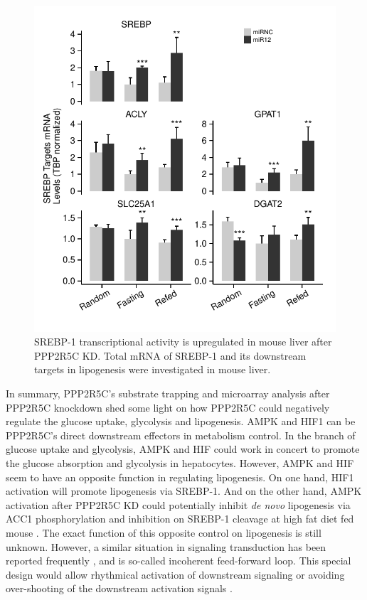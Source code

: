 \begin{figure}[!tbp]
\centering
\includegraphics[width=1\textwidth]{figs/fig2-55 liver srebp.pdf}
\caption[SREBP-1 activity increased in mouse liver]{\footnotesize SREBP-1 transcriptional activity is upregulated in mouse liver after PPP2R5C KD. Total mRNA of SREBP-1 and its downstream targets in lipogenesis were investigated in mouse liver.}
\label{fig:fig2.55}
\end{figure}


In summary, PPP2R5C's substrate trapping and microarray analysis after PPP2R5C knockdown shed some light on how PPP2R5C could negatively regulate the glucose uptake, glycolysis and lipogenesis. AMPK and HIF1\textalpha{} can be PPP2R5C's direct downstream effectors in metabolism control. In the branch of glucose uptake and glycolysis, AMPK and HIF\textalpha{} could work in concert to promote the glucose absorption and glycolysis in hepatocytes. However, AMPK and HIF\textalpha{} seem to have an opposite function in regulating lipogenesis. On one hand, HIF1\textalpha{} activation will promote lipogenesis via SREBP-1. And on the other hand, AMPK activation after PPP2R5C KD could potentially inhibit \textit{de novo} lipogenesis via ACC1 phosphorylation \cite{sullivan_inhibition_1994} and inhibition on SREBP-1 cleavage at high fat diet fed mouse \cite{li_ampk_2011}. The exact function of this opposite control on lipogenesis is still unknown. However, a similar situation in signaling transduction has been reported frequently \cite{kuttykrishnan_quantitative_2010,goentoro_incoherent_2009}, and is so-called incoherent feed-forward loop. This special design would allow rhythmical activation of downstream signaling or avoiding over-shooting of the downstream activation signals \cite[Chapter 4]{alon_introduction_2006}. 

